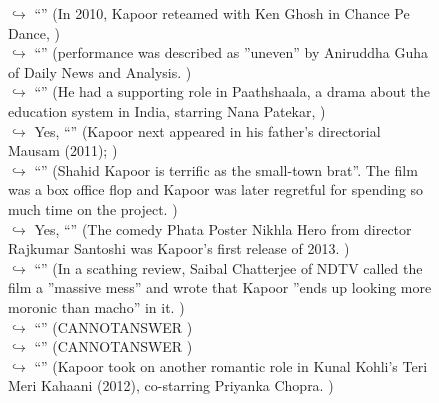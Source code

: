\documentclass[11pt,a4paper, onecolumn]{article}
\begin{document}
\begin{figure}[t] \small \begin{tcolorbox}[boxsep=0pt,left=5pt,right=0pt,top=2pt,colback = yellow!5] \begin{dialogue}
 \small 
\colorbox{pink!25}{$\hookrightarrow$}
{ ``'' (In 2010, Kapoor reteamed with Ken Ghosh in Chance Pe Dance, ) }
\\
\colorbox{pink!25}{$\hookrightarrow$}
{ ``'' (performance was described as ''uneven'' by Aniruddha Guha of Daily News and Analysis. ) }
\\
\colorbox{pink!25}{$\hookrightarrow$}
{ ``'' (He had a supporting role in Paathshaala, a drama about the education system in India, starring Nana Patekar, ) }
\\
\colorbox{pink!25}{$\hookrightarrow$}
\colorbox{red!25}{Yes,}
{ ``'' (Kapoor next appeared in his father's directorial Mausam (2011); ) }
\\
\colorbox{pink!25}{$\hookrightarrow$}
{ ``'' (Shahid Kapoor is terrific as the small-town brat''. The film was a box office flop and Kapoor was later regretful for spending so much time on the project. ) }
\\
\colorbox{pink!25}{$\hookrightarrow$}
\colorbox{red!25}{Yes,}
{ ``'' (The comedy Phata Poster Nikhla Hero from director Rajkumar Santoshi was Kapoor's first release of 2013. ) }
\\
\colorbox{pink!25}{$\hookrightarrow$}
{ ``'' (In a scathing review, Saibal Chatterjee of NDTV called the film a ''massive mess'' and wrote that Kapoor ''ends up looking more moronic than macho'' in it. ) }
\\
\colorbox{pink!25}{$\hookrightarrow$}
{ ``'' (CANNOTANSWER ) }
\\
\colorbox{pink!25}{$\hookrightarrow$}
{ ``'' (CANNOTANSWER ) }
\\
\colorbox{pink!25}{$\hookrightarrow$}
{ ``'' (Kapoor took on another romantic role in Kunal Kohli's Teri Meri Kahaani (2012), co-starring Priyanka Chopra. ) }
\\
 \end{dialogue}\end{tcolorbox}\end{figure}
\end{document}
